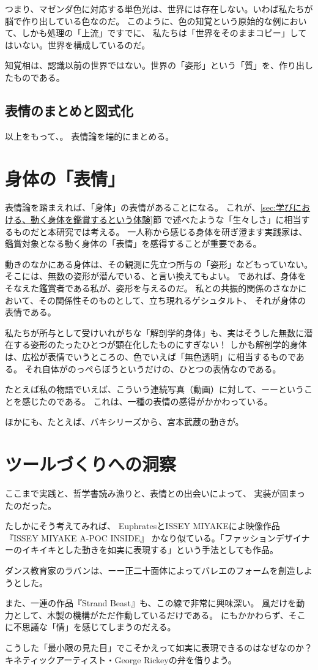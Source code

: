 つまり、マゼンダ色に対応する単色光は、世界には存在しない。いわば私たちが脳で作り出している色なのだ。
このように、色の知覚という原始的な例において、しかも処理の「上流」ですでに、
私たちは「世界をそのままコピー」してはいない。世界を構成しているのだ。

知覚相は、認識以前の世界ではない。世界の「姿形」という「質」を、作り出したものである。




\subsection{表情のまとめと図式化}
以上をもって、。
表情論を端的にまとめる。

\section{身体の「表情」}
表情論を踏まえれば、「身体」の表情があることになる。
これが、\ref{sec:学びにおける、動く身体を鑑賞するという体験}節
で述べたような「生々しさ」に相当するものだと本研究では考える。
一人称から感じる身体を研ぎ澄ます実践家は、鑑賞対象となる動く身体の「表情」を感得することが重要である。

動きのなかにある身体は、その観測に先立つ所与の「姿形」などもっていない。
そこには、無数の姿形が潜んでいる、と言い換えてもよい。
であれば、身体をそなえた鑑賞者である私が、姿形を与えるのだ。
私との共振的関係のさなかにおいて、その関係性そのものとして、立ち現れるゲシュタルト、
それが身体の表情である。


私たちが所与として受けいれがちな「解剖学的身体」も、実はそうした無数に潜在する姿形のたったひとつが顕在化したものにすぎない！
しかも解剖学的身体は、広松が表情でいうところの、色でいえば「無色透明」に相当するものである。
それ自体がのっぺらぼうというだけの、ひとつの表情なのである。

たとえば私の物語でいえば、こういう連続写真（動画）に対して、ーーということを感じたのである。
これは、一種の表情の感得がかかわっている。

ほかにも、たとえば、バキシリーズから、宮本武蔵の動きが。

\section{ツールづくりへの洞察}
ここまで実践と、哲学書読み漁りと、表情との出会いによって、
実装が固まったのだった。

たしかにそう考えてみれば、
EuphratesとISSEY MIYAKEによ映像作品『ISSEY MIYAKE A-POC INSIDE』\cite{sato_euphrates}
かなり似ている。「ファッションデザイナーのイキイキとした動きを如実に表現する」という手法としても作品。

ダンス教育家のラバンは、ーー正二十面体によってバレエのフォームを創造しようとした。

また、一連の作品『Strand Beast』も、この線で非常に興味深い。
風だけを動力として、木製の機構がただ作動しているだけである。
にもかかわらず、そこに不思議な「情」を感じてしまうのだえる。

こうした「最小限の見た目」でこそかえって如実に表現できるのはなぜなのか？
キネティックアーティスト・George Rickeyの弁を借りよう。

